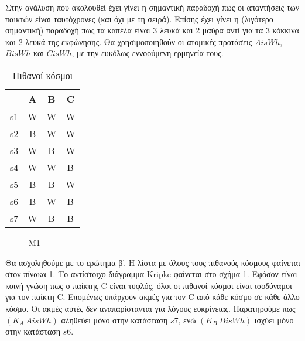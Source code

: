 Στην ανάλυση που ακολουθεί έχει γίνει η σημαντική παραδοχή πως οι απαντήσεις των παικτών είναι ταυτόχρονες (και όχι με τη σειρά). Επίσης έχει γίνει η (λιγότερο σημαντική) παραδοχή πως τα καπέλα είναι 3 λευκά και 2 μαύρα αντί για τα 3 κόκκινα και 2 λευκά της εκφώνησης. Θα χρησιμοποιηθούν οι ατομικές προτάσεις $AisWh$, $BisWh$ και $CisWh$, με την ευκόλως εννοούμενη ερμηνεία τους.

\begin{table}[h!]
\centering
\begin{tabular}{ c|c c c }
  & A & B & C \\
 \hline
 s1 & W & W & W \\ 
 \hline
 s2 & B & W & W \\
 \hline
 s3 & W & B & W \\ 
 \hline
 s4 & W & W & B \\ 
 \hline
 s5 & B & B & W \\ 
 \hline
 s6 & B & W & B \\ 
 \hline
 s7 & W & B & B \\ 
\end{tabular}
\caption{Πιθανοί κόσμοι}
\label{worlds}
\end{table}

\begin{figure}[h!]
\centering
{}
\caption{M1}
\label{M1}
\end{figure}

Θα ασχοληθούμε με το ερώτημα β'. Η λίστα με όλους τους πιθανούς κόσμους φαίνεται στον πίνακα \ref{worlds}. Το αντίστοιχο διάγραμμα Kripke φαίνεται στο σχήμα \ref{M1}. Εφόσον είναι κοινή γνώση πως ο παίκτης C είναι τυφλός, όλοι οι πιθανοί κόσμοι είναι ισοδύναμοι για τον παίκτη C. Επομένως υπάρχουν ακμές για τον C από κάθε κόσμο σε κάθε άλλο κόσμο. Οι ακμές αυτές δεν αναπαρίστανται για λόγους ευκρίνειας. Παρατηρούμε πως $(K_A\ AisWh)$ αληθεύει μόνο στην κατάσταση $s7$, ενώ $(K_B\ BisWh)$ ισχύει μόνο στην κατάσταση $s6$.

